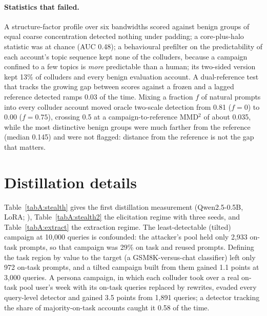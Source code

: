 \paragraph{Statistics that failed.} A structure-factor profile over six bandwidths scored against benign groups of equal coarse concentration detected nothing under padding; a core-plus-halo statistic was at chance (AUC 0.48); a behavioural prefilter on the predictability of each account's topic sequence kept none of the colluders, because a campaign confined to a few topics is \emph{more} predictable than a human; its two-sided version kept 13\% of colluders and every benign evaluation account. A dual-reference test that tracks the growing gap between scores against a frozen and a lagged reference \citep{scheffer2009early} detected ramps 0.03 of the time. Mixing a fraction $f$ of natural prompts into every colluder account moved oracle two-scale detection from 0.81 ($f=0$) to 0.00 ($f=0.75$), crossing 0.5 at a campaign-to-reference MMD$^2$ of about 0.035, while the most distinctive benign groups were much farther from the reference (median 0.145) and were not flagged: distance from the reference is not the gap that matters.



\section{Distillation details}
\label{app:distill}

Table~\ref{tabA:stealth} gives the first distillation measurement (Qwen2.5-0.5B, LoRA; \citealp{hu2022lora}), Table~\ref{tabA:stealth2} the elicitation regime with three seeds, and Table~\ref{tabA:extract} the extraction regime. The least-detectable (tilted) campaign at 10{,}000 queries is confounded: the attacker's pool held only 2{,}933 on-task prompts, so that campaign was 29\% on task and reused prompts. Defining the task region by value to the target (a GSM8K-versus-chat classifier) left only 972 on-task prompts, and a tilted campaign built from them gained 1.1 points at 3{,}000 queries. A persona campaign, in which each colluder took over a real on-task pool user's week with its on-task queries replaced by rewrites, evaded every query-level detector and gained 3.5 points from 1{,}891 queries; a detector tracking the share of majority-on-task accounts caught it 0.58 of the time.

